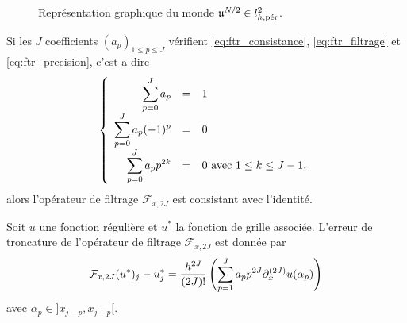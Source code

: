 \begin{figure}[htbp]
\begin{center}
\end{center}
\caption{Représentation graphique du monde $\mathfrak{u}^{N/2} \in l^2_{h,\per}$.}
\label{fig:hf_waves}
\end{figure}

\begin{proposition}
Si les $J$ coefficients $(a_p)_{1 \leq p \leq J}$ vérifient \eqref{eq:ftr_consistance}, \eqref{eq:ftr_filtrage} et \eqref{eq:ftr_precision}, c'est a dire
\begin{equation}
\left\lbrace
\begin{array}{rcl}
\gsum_{p=0}^J a_p & = & 1 \\
\gsum_{p=0}^J a_p (-1)^p & = & 0 \\
\gsum_{p=0}^J a_p p^{2k} & = & 0 \text{ avec } 1 \leq k \leq J-1,
\end{array}
\right.
\label{eq:system_ftr}
\end{equation}
alors l'opérateur de filtrage $\mathcal{F}_{x,2J}$ est consistant avec l'identité.

Soit $u$ une fonction régulière et $u^*$ la fonction de grille associée. L'erreur de troncature de l'opérateur de filtrage $\mathcal{F}_{x,2J}$ est donnée par
\begin{equation}
\mathcal{F}_{x,2J}(u^*)_j - u^*_j = \dfrac{h^{2J}}{(2J)!} \left( \gsum_{p=1}^J a_p p^{2J} \partial_x^{(2J)}u(\alpha_p) \right)
\end{equation}
avec $\alpha_p \in ]x_{j-p}, x_{j+p}[$.
\label{prop:filter_def}
\end{proposition}

